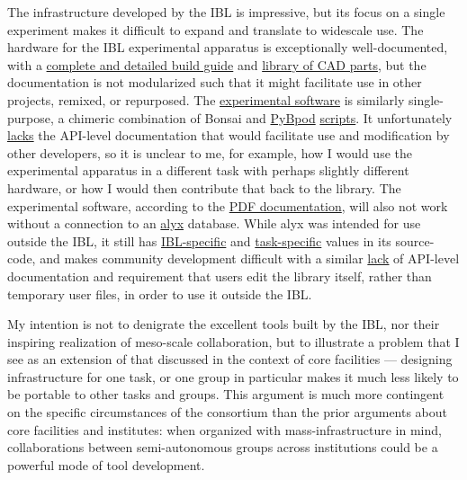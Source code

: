 \documentclass[10pt]{article}
\begin{document}
\begin{multicols}{2}
The infrastructure developed by the IBL is impressive, but its focus on
a single experiment makes it difficult to expand and translate to
widescale use. The hardware for the IBL experimental apparatus is
exceptionally well-documented, with a
\href{https://figshare.com/articles/preprint/A_standardized_and_reproducible_method_to_measure_decision-making_in_mice_Appendix_3_IBL_protocol_for_setting_up_the_behavioral_training_rig/11634732}{complete
and detailed build guide} and
\href{https://figshare.com/articles/online_resource/A_standardized_and_reproducible_method_to_measure_decision-making_in_mice_CAD_files_for_behavior_rig/11639973}{library
of CAD parts}, but the documentation is not modularized such that it
might facilitate use in other projects, remixed, or repurposed. The
\href{https://github.com/int-brain-lab/iblrig}{experimental software} is
similarly single-purpose, a chimeric combination of Bonsai \cite{lopesBonsaiEventbasedFramework2015}  and
\href{https://github.com/pybpod/pybpod}{PyBpod}
\href{https://github.com/int-brain-lab/iblrig/tree/master/tasks/_iblrig_tasks_ephysChoiceWorld}{scripts}.
It unfortunately
\href{https://iblrig.readthedocs.io/en/latest/index.html}{lacks} the
API-level documentation that would facilitate use and modification by
other developers, so it is unclear to me, for example, how I would use
the experimental apparatus in a different task with perhaps slightly
different hardware, or how I would then contribute that back to the
library. The experimental software, according to the
\href{https://figshare.com/articles/preprint/A_standardized_and_reproducible_method_to_measure_decision-making_in_mice_Appendix_3_IBL_protocol_for_setting_up_the_behavioral_training_rig/11634732}{PDF
documentation}, will also not work without a connection to an
\href{https://github.com/cortex-lab/alyx}{alyx} database. While alyx was
intended for use outside the IBL, it still has
\href{https://github.com/cortex-lab/alyx/blob/07f481f6bbde668b81ad2634f4c42df4d6a74e44/alyx/data/management/commands/files.py\#L188}{IBL-specific}
and
\href{https://github.com/cortex-lab/alyx/blob/07f481f6bbde668b81ad2634f4c42df4d6a74e44/alyx/data/fixtures/data.datasettype.json\#L29}{task-specific}
values in its source-code, and makes community development difficult
with a similar \href{https://alyx.readthedocs.io/en/latest/}{lack} of
API-level documentation and requirement that users edit the library
itself, rather than temporary user files, in order to use it outside the
IBL.

My intention is not to denigrate the excellent tools built by the IBL,
nor their inspiring realization of meso-scale collaboration, but to
illustrate a problem that I see as an extension of that discussed in the
context of core facilities --- designing infrastructure for one task, or
one group in particular makes it much less likely to be portable to
other tasks and groups. This argument is much more contingent on the
specific circumstances of the consortium than the prior arguments about
core facilities and institutes: when organized with mass-infrastructure
in mind, collaborations between semi-autonomous groups across
institutions could be a powerful mode of tool development.


\end{multicols}
\end{document}
